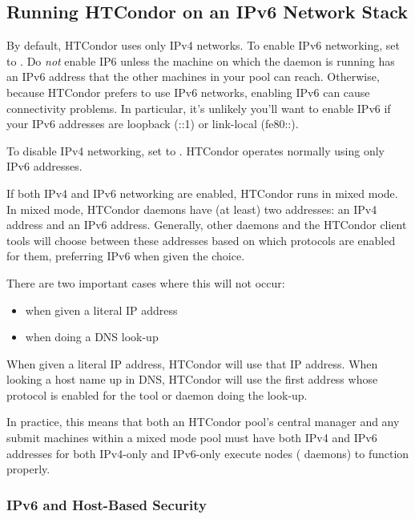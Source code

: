 \subsection{\label{sec:ipv6}Running HTCondor on an IPv6 Network Stack}

By default, HTCondor uses only IPv4 networks.  To enable IPv6 networking,
set  to .  Do \emph{not} enable IP6 unless
the machine on which the daemon is running has an IPv6 address that the
other machines in your pool can reach.  Otherwise, because HTCondor prefers
to use IPv6 networks, enabling IPv6 can cause connectivity problems.  In
particular, it's unlikely you'll want to enable IPv6 if your IPv6 addresses
are loopback (::1) or link-local (fe80::).

To disable IPv4 networking, set  to .
HTCondor operates normally using only IPv6 addresses.

If both IPv4 and IPv6 networking are enabled, HTCondor runs in mixed mode.
In mixed mode, HTCondor daemons have (at least) two addresses: an IPv4
address and an IPv6 address.  Generally, other daemons and the HTCondor client
tools will choose between these addresses based on which protocols are enabled
for them, preferring IPv6 when given the choice.

There are two important cases where this will not occur:
\begin{itemize}
\item{when given a literal IP address}
\item{when doing a DNS look-up}
\end{itemize}

When given a literal IP address, HTCondor will use that IP address.  When
looking a host name up in DNS, HTCondor will use the first address whose
protocol is enabled for the tool or daemon doing the look-up.

In practice, this means that both an HTCondor pool's central manager
and any submit machines within a mixed mode pool must have both IPv4 and IPv6
addresses for both IPv4-only and IPv6-only execute nodes
( daemons) to function properly.

\subsubsection{IPv6 and Host-Based Security}

